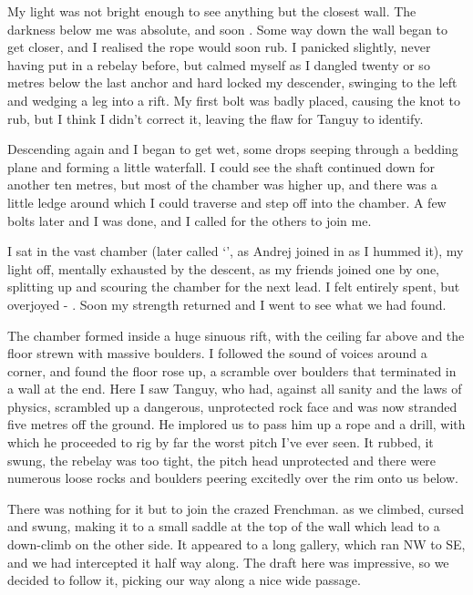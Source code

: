 My light was not bright enough to see anything but the closest wall. The darkness below me was absolute, and soon . Some way down the wall began to get closer, and I realised the rope would soon rub. I panicked slightly, never having put in a rebelay before, but calmed myself as I dangled twenty or so metres below the last anchor and hard locked my descender, swinging to the left and wedging a leg into a rift. My first bolt was badly placed, causing the knot to rub, but I think I didn’t correct it, leaving the flaw for Tanguy to identify. 
 
Descending again and I began to get wet, some drops seeping through a bedding plane and forming a little waterfall. I could see the shaft continued down for another ten metres, but most of the chamber was higher up, and there was a little ledge around which I could traverse and step off into the chamber. A few bolts later and I was done, and I called for the others to join me.
 
I sat in the vast chamber (later called ‘’, as Andrej joined in as I hummed it), my light off, mentally exhausted by the descent, as my friends joined one by one, splitting up and scouring the chamber for the next lead. I felt entirely spent, but overjoyed - . Soon my strength returned and I went to see what we had found.
 
The chamber formed inside a huge sinuous rift, with the ceiling far above and the floor strewn with massive boulders. I followed the sound of voices around a corner, and found the floor rose up, a scramble over boulders that terminated in a wall at the end. Here I saw Tanguy, who had, against all sanity and the laws of physics, scrambled up a dangerous, unprotected rock face and was now stranded five metres off the ground. He implored us to pass him up a rope and a drill, with which he proceeded to rig by far the worst pitch I’ve ever seen. It rubbed, it swung, the rebelay was too tight, the pitch head unprotected and there were numerous loose rocks and boulders peering excitedly over the rim onto us below.


 
There was nothing for it but to join the crazed Frenchman.  as we climbed, cursed and swung, making it to a small saddle at the top of the wall which lead to a down-climb on the other side. It appeared to a long gallery, which ran NW to SE, and we had intercepted it half way along. The draft here was impressive, so we decided to follow it, picking our way along a nice wide passage.
 
